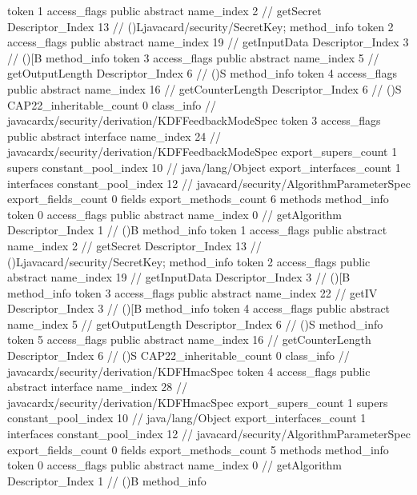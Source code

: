 {{{{{					token	1
					access_flags	public abstract
					name_index	2		// getSecret
					Descriptor_Index	13		// ()Ljavacard/security/SecretKey;
				}
				method_info {
					token	2
					access_flags	public abstract
					name_index	19		// getInputData
					Descriptor_Index	3		// ()[B
				}
				method_info {
					token	3
					access_flags	public abstract
					name_index	5		// getOutputLength
					Descriptor_Index	6		// ()S
				}
				method_info {
					token	4
					access_flags	public abstract
					name_index	16		// getCounterLength
					Descriptor_Index	6		// ()S
				}
			}
			CAP22_inheritable_count	0
		}
		class_info {		// javacardx/security/derivation/KDFFeedbackModeSpec
			token	3
			access_flags	public abstract interface
			name_index	24		// javacardx/security/derivation/KDFFeedbackModeSpec
			export_supers_count	1
			supers {
				constant_pool_index	10		// java/lang/Object
			}
			export_interfaces_count	1
			interfaces {
				constant_pool_index	12		// javacard/security/AlgorithmParameterSpec
			}
			export_fields_count	0
			fields {
			}
			export_methods_count	6
			methods {
				method_info {
					token	0
					access_flags	public abstract
					name_index	0		// getAlgorithm
					Descriptor_Index	1		// ()B
				}
				method_info {
					token	1
					access_flags	public abstract
					name_index	2		// getSecret
					Descriptor_Index	13		// ()Ljavacard/security/SecretKey;
				}
				method_info {
					token	2
					access_flags	public abstract
					name_index	19		// getInputData
					Descriptor_Index	3		// ()[B
				}
				method_info {
					token	3
					access_flags	public abstract
					name_index	22		// getIV
					Descriptor_Index	3		// ()[B
				}
				method_info {
					token	4
					access_flags	public abstract
					name_index	5		// getOutputLength
					Descriptor_Index	6		// ()S
				}
				method_info {
					token	5
					access_flags	public abstract
					name_index	16		// getCounterLength
					Descriptor_Index	6		// ()S
				}
			}
			CAP22_inheritable_count	0
		}
		class_info {		// javacardx/security/derivation/KDFHmacSpec
			token	4
			access_flags	public abstract interface
			name_index	28		// javacardx/security/derivation/KDFHmacSpec
			export_supers_count	1
			supers {
				constant_pool_index	10		// java/lang/Object
			}
			export_interfaces_count	1
			interfaces {
				constant_pool_index	12		// javacard/security/AlgorithmParameterSpec
			}
			export_fields_count	0
			fields {
			}
			export_methods_count	5
			methods {
				method_info {
					token	0
					access_flags	public abstract
					name_index	0		// getAlgorithm
					Descriptor_Index	1		// ()B
				}
				method_info {
}}}}}
